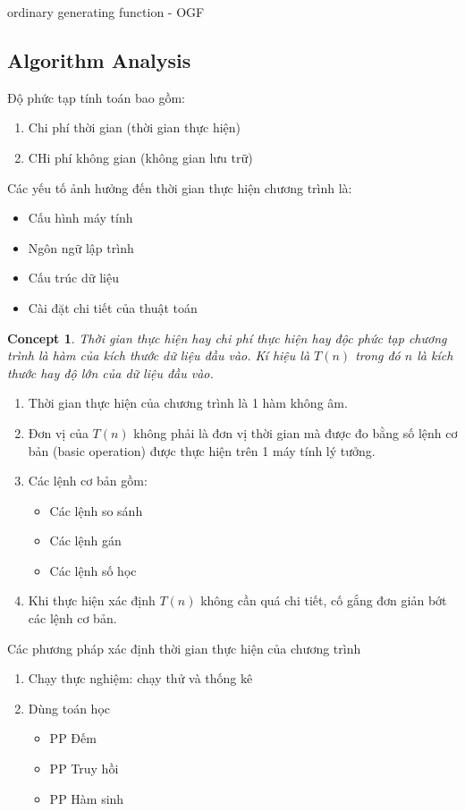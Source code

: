 \documentclass{article}
\newtheorem*{concept}{Concept}
\begin{document}
    ordinary generating function - OGF
\subsection{Algorithm Analysis}
Độ phức tạp tính toán bao gồm:
\begin{enumerate}
    \item Chi phí thời gian (thời gian thực hiện)
    \item CHi phí không gian (không gian lưu trữ)
\end{enumerate}
Các yếu tố ảnh hưởng đến thời gian thực hiện chương trình là:
\begin{itemize}
    \item Cấu hình máy tính
    \item Ngôn ngữ lập trình
    \item Cấu trúc dữ liệu
    \item Cài đặt chi tiết của thuật toán
\end{itemize}

\begin{concept}
    Thời gian thực hiện hay chi phí thực hiện hay độc phức tạp chương trình là hàm của kích thước dữ liệu đầu vào. Kí hiệu là $T(n) $ trong đó $n$ là kích thước hay độ lớn của dữ liệu đầu vào.
    
\end{concept}

\begin{enumerate}
    \item Thời gian thực hiện của chương trình là 1 hàm không âm.
    \item Đơn vị của $T(n)$ không phải là đơn vị thời gian mà được đo bằng số lệnh cơ bản (basic operation) được thực hiện trên 1 máy tính lý tưởng.
    \item
        Các lệnh cơ bản gồm:
        \begin{itemize}
            \item Các lệnh so sánh
            \item Các lệnh gán
            \item Các lệnh số học
        \end{itemize}
    \item Khi thực hiện xác định $T(n)$ không cần quá chi tiết, cố gắng đơn giản bớt các lệnh cơ bản.
\end{enumerate}

Các phương pháp xác định thời gian thực hiện của chương trình
\begin{enumerate}
    \item Chạy thực nghiệm: chạy thử và thống kê
    \item Dùng toán học
        \begin{itemize}
            \item PP Đếm
            \item PP Truy hồi
            \item PP Hàm sinh
        \end{itemize}
\end{enumerate}
\end{document}
